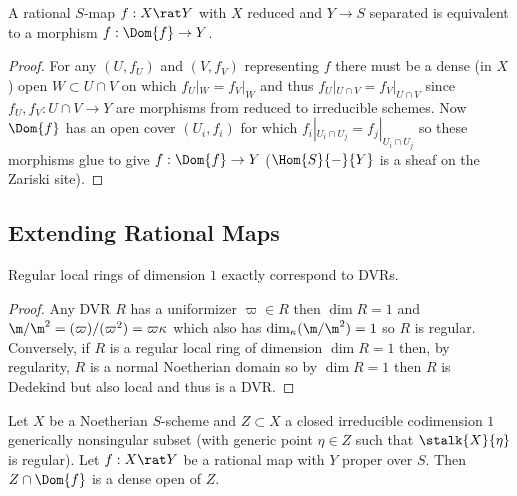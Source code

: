 \documentclass[12pt]{article}
\begin{document}
\begin{lemma}
A rational $S$-map $f : X \rat Y$ with $X$ reduced and $Y \to S$ separated is equivalent to a morphism $f : \Dom{f} \to Y$. 
\end{lemma}

\begin{proof}
For any $(U, f_U)$ and $(V, f_V)$ representing $f$ there must be a dense (in $X$) open $W \subset U \cap V$ on which $f_U|_W = f_V|_W$ and thus $f_U |_{U \cap V} = f_V |_{U \cap V}$ since $f_U, f_V : U \cap V \to Y$ are morphisms from reduced to irreducible schemes. Now $\Dom{f}$ has an open cover $(U_i, f_i)$ for which $f_i |_{U_i \cap U_j} = f_j |_{U_i \cap U_j}$ so these morphisms glue to give $f : \Dom{f} \to Y$ ($\Hom{S}{-}{Y}$ is a sheaf on the Zariski site).  
\end{proof}



\subsection{Extending Rational Maps}

\begin{lemma}
Regular local rings of dimension $1$ exactly correspond to DVRs.
\end{lemma}

\begin{proof}
Any DVR $R$ has a uniformizer $\varpi \in R$ then $\dim{R} = 1$ and $\m / \m^2 = (\varpi)/(\varpi^2) = \varpi \kappa$ which also has $\dim_{\kappa}(\m / \m^2) = 1$ so $R$ is regular.
Conversely, if $R$ is a regular local ring of dimension $\dim{R} = 1$ then, by regularity, $R$ is a normal Noetherian domain so by $\dim{R} = 1$ then $R$ is Dedekind but also local and thus is a DVR. 
\end{proof}

\begin{proposition}
Let $X$ be a Noetherian $S$-scheme and $Z \subset X$ a closed irreducible codimension $1$ generically nonsingular subset (with generic point $\eta \in Z$ such that $\stalk{X}{\eta}$ is regular). Let $f : X \rat Y$ be a rational map with $Y$ proper over $S$. Then $Z \cap \Dom{f}$ is a dense open of $Z$.
\end{proposition}
\end{document}
